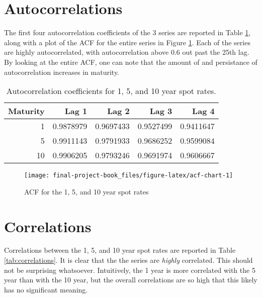 \documentclass[openany]{book}
\theoremstyle{definition}
\theoremstyle{definition}
\theoremstyle{definition}
\theoremstyle{remark}
\begin{document}
\hypertarget{autocorrelations}{%
\section{Autocorrelations}\label{autocorrelations}}

The first four autocorrelation coefficients of the 3 series are reported
in Table \ref{tab:acf-table}, along with a plot of the ACF for the
entire series in Figure \ref{fig:acf-chart}. Each of the series are
highly autocorrelated, with autocorrelation above 0.6 out past the 25th
lag. By looking at the entire ACF, one can note that the amount of and
persistance of autocorrelation increases in maturity.

\small

\begin{table}[H]

\caption{\label{tab:acf-table}Autocorrelation coefficients for 1, 5, and 10 year spot rates.}
\centering
\begin{tabular}[t]{rrrrr}
\toprule
Maturity & Lag 1 & Lag 2 & Lag 3 & Lag 4\\
\midrule
1 & 0.9878979 & 0.9697433 & 0.9527499 & 0.9411647\\
5 & 0.9911143 & 0.9791933 & 0.9686252 & 0.9599084\\
10 & 0.9906205 & 0.9793246 & 0.9691974 & 0.9606667\\
\bottomrule
\end{tabular}
\end{table}

\normalsize

\small

\begin{figure}[H]

{\centering \texttt{[image: final-project-book\_files/figure-latex/acf-chart-1]} 

}

\caption{ACF for the 1, 5, and 10 year spot rates}\label{fig:acf-chart}
\end{figure}

\normalsize

\hypertarget{correlations}{%
\section{Correlations}\label{correlations}}

Correlations between the 1, 5, and 10 year spot rates are reported in
Table \ref{tab:correlations}. It is clear that the the series are
\emph{highly} correlated. This should not be surprising whatsoever.
Intuitively, the 1 year is more correlated with the 5 year than with the
10 year, but the overall correlations are so high that this likely has
no significant meaning.
\end{document}
